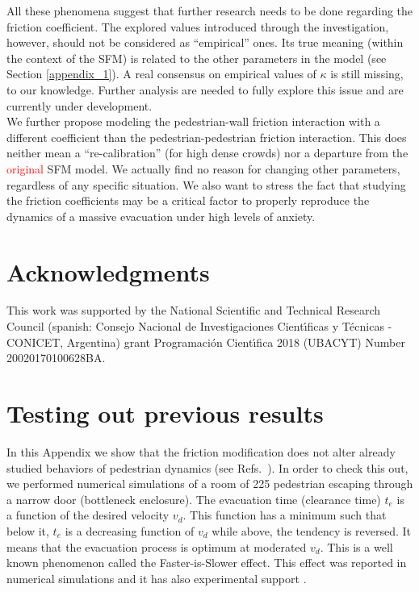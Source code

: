\documentclass[preprint,12pt]{elsarticle}
\begin{document}
All these phenomena suggest that further research needs to be  
done regarding the friction coefficient. The explored values 
introduced through the investigation, however, should not be considered as 
``empirical'' ones. Its true meaning (within the context of the SFM) is related 
to the other parameters in the model (see Section \ref{appendix_1}). A real consensus 
on empirical values of $\kappa$ is still missing, to our knowledge. Further analysis are needed to fully explore this issue and are currently under development. \\


We further propose modeling the pedestrian-wall friction 
interaction with a different coefficient than the pedestrian-pedestrian friction 
interaction. This does neither mean a ``re-calibration'' (for 
high dense crowds) nor a departure from the \textcolor{red}{original} SFM model. 
We actually find no reason for changing other parameters, regardless of any 
specific situation. We also want to stress the fact that studying the friction 
coefficients may be a critical factor to properly reproduce the dynamics of a 
massive evacuation under high levels of anxiety. 
\\  

\section*{Acknowledgments}
This work was supported by the National Scientific and Technical 
Research Council (spanish: Consejo Nacional de Investigaciones Cient\'\i ficas 
y T\'ecnicas - CONICET, Argentina) grant Programaci\'on Cient\'\i fica 2018 (UBACYT) Number 20020170100628BA.

\appendix



\section{\label{appendix_3} Testing out previous results}


In this Appendix we show that the friction modification does not alter already 
studied behaviors of pedestrian dynamics (see 
Refs.~\cite{Dorso2,Dorso1,Dorso3}). In order to check this out, we performed 
numerical simulations of a room of 225 pedestrian escaping through a narrow door 
(bottleneck enclosure). The evacuation time (clearance time) $t_e$ is a function 
of the desired velocity $v_d$. This function has a minimum such that below it, 
$t_e$ is a decreasing function of $v_d$ while above, the tendency is reversed. 
It means that the evacuation process is optimum at moderated $v_d$. This is a 
well known phenomenon called the Faster-is-Slower effect. This effect was 
reported in numerical simulations \cite{Dorso1,Dorso5} and it has also 
experimental support \cite{parisi1}. \\
\end{document}
